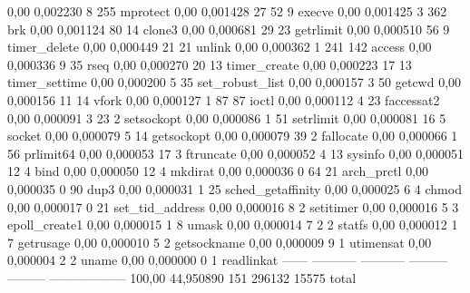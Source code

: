 \begin{myverbatim}
  0,00    0,002230           8       255           mprotect
  0,00    0,001428          27        52         9 execve
  0,00    0,001425           3       362           brk
  0,00    0,001124          80        14           clone3
  0,00    0,000681          29        23           getrlimit
  0,00    0,000510          56         9           timer_delete
  0,00    0,000449          21        21           unlink
  0,00    0,000362           1       241       142 access
  0,00    0,000336           9        35           rseq
  0,00    0,000270          20        13           timer_create
  0,00    0,000223          17        13           timer_settime
  0,00    0,000200           5        35           set_robust_list
  0,00    0,000157           3        50           getcwd
  0,00    0,000156          11        14           vfork
  0,00    0,000127           1        87        87 ioctl
  0,00    0,000112           4        23           faccessat2
  0,00    0,000091           3        23         2 setsockopt
  0,00    0,000086           1        51           setrlimit
  0,00    0,000081          16         5           socket
  0,00    0,000079           5        14           getsockopt
  0,00    0,000079          39         2           fallocate
  0,00    0,000066           1        56           prlimit64
  0,00    0,000053          17         3           ftruncate
  0,00    0,000052           4        13           sysinfo
  0,00    0,000051          12         4           bind
  0,00    0,000050          12         4           mkdirat
  0,00    0,000036           0        64        21 arch_prctl
  0,00    0,000035           0        90           dup3
  0,00    0,000031           1        25           sched_getaffinity
  0,00    0,000025           6         4           chmod
  0,00    0,000017           0        21           set_tid_address
  0,00    0,000016           8         2           setitimer
  0,00    0,000016           5         3           epoll_create1
  0,00    0,000015           1         8           umask
  0,00    0,000014           7         2         2 statfs
  0,00    0,000012           1         7           getrusage
  0,00    0,000010           5         2           getsockname
  0,00    0,000009           9         1           utimensat
  0,00    0,000004           2         2           uname
  0,00    0,000000           0         1           readlinkat
------ ----------- ----------- --------- --------- ------------------
100,00   44,950890         151    296132     15575 total
\end{myverbatim}